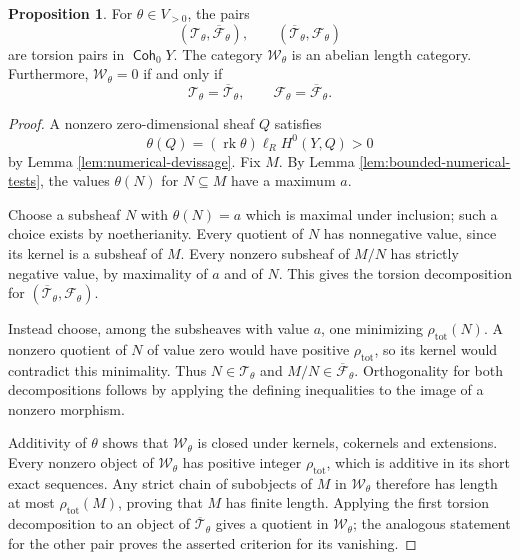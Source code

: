 \documentclass[a4paper,reqno]{amsart}
\def\F{\mathcal{F}}
\def\T{\mathcal{T}}
\def\W{\mathcal{W}}
\DeclareMathOperator{\Coh}{\mathsf{Coh}}
\DeclareMathOperator{\rk}{rk}
\theoremstyle{definition}
\newtheorem{Prop}[Thm]{Proposition}
\begin{document}
\begin{Prop}\label{prop:positive-numerical-pairs}
For $\theta\in V_{>0}$, the pairs
\[
(\T_\theta,\overline{\F}_\theta),
\qquad (\overline{\T}_\theta,\F_\theta)
\]
are torsion pairs in $\Coh_0Y$. The category $\W_\theta$ is an abelian length category. Furthermore, $\W_\theta=0$ if and only if
\[
\T_\theta=\overline{\T}_\theta,
\qquad \F_\theta=\overline{\F}_\theta.
\]
\end{Prop}
\begin{proof}
A nonzero zero-dimensional sheaf $Q$ satisfies
\[
\theta(Q)=(\rk\theta)\ell_R H^0(Y,Q)>0
\]
by Lemma \ref{lem:numerical-devissage}. Fix $M$. By Lemma \ref{lem:bounded-numerical-tests}, the values $\theta(N)$ for $N\subseteq M$ have a maximum $a$.

Choose a subsheaf $N$ with $\theta(N)=a$ which is maximal under inclusion; such a choice exists by noetherianity. Every quotient of $N$ has nonnegative value, since its kernel is a subsheaf of $M$. Every nonzero subsheaf of $M/N$ has strictly negative value, by maximality of $a$ and of $N$. This gives the torsion decomposition for $(\overline{\T}_\theta,\F_\theta)$.

Instead choose, among the subsheaves with value $a$, one minimizing $\rho_{\mathrm{tot}}(N)$. A nonzero quotient of $N$ of value zero would have positive $\rho_{\mathrm{tot}}$, so its kernel would contradict this minimality. Thus $N\in\T_\theta$ and $M/N\in\overline{\F}_\theta$. Orthogonality for both decompositions follows by applying the defining inequalities to the image of a nonzero morphism.

Additivity of $\theta$ shows that $\W_\theta$ is closed under kernels, cokernels and extensions. Every nonzero object of $\W_\theta$ has positive integer $\rho_{\mathrm{tot}}$, which is additive in its short exact sequences. Any strict chain of subobjects of $M$ in $\W_\theta$ therefore has length at most $\rho_{\mathrm{tot}}(M)$, proving that $M$ has finite length. Applying the first torsion decomposition to an object of $\overline{\T}_\theta$ gives a quotient in $\W_\theta$; the analogous statement for the other pair proves the asserted criterion for its vanishing.
\end{proof}
\end{document}
